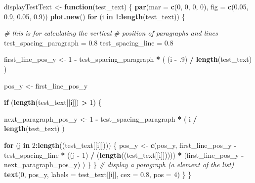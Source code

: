 \documentclass[12pt,]{book}
\newenvironment{Shaded}{\begin{snugshade}}{\end{snugshade}}
\newcommand{\CommentTok}[1]{\textcolor[rgb]{0.56,0.35,0.01}{\textit{#1}}}
\newcommand{\ControlFlowTok}[1]{\textcolor[rgb]{0.13,0.29,0.53}{\textbf{#1}}}
\newcommand{\DataTypeTok}[1]{\textcolor[rgb]{0.13,0.29,0.53}{#1}}
\newcommand{\DecValTok}[1]{\textcolor[rgb]{0.00,0.00,0.81}{#1}}
\newcommand{\FloatTok}[1]{\textcolor[rgb]{0.00,0.00,0.81}{#1}}
\newcommand{\KeywordTok}[1]{\textcolor[rgb]{0.13,0.29,0.53}{\textbf{#1}}}
\newcommand{\NormalTok}[1]{#1}
\newcommand{\OperatorTok}[1]{\textcolor[rgb]{0.81,0.36,0.00}{\textbf{#1}}}
\newcommand{\StringTok}[1]{\textcolor[rgb]{0.31,0.60,0.02}{#1}}
\begin{document}
\begin{Shaded}
\begin{Highlighting}[]
\NormalTok{displayTestText <-}\StringTok{ }\ControlFlowTok{function}\NormalTok{(test_text) \{}
  \KeywordTok{par}\NormalTok{(}\DataTypeTok{mar =} \KeywordTok{c}\NormalTok{(}\DecValTok{0}\NormalTok{, }\DecValTok{0}\NormalTok{, }\DecValTok{0}\NormalTok{, }\DecValTok{0}\NormalTok{), }\DataTypeTok{fig =} \KeywordTok{c}\NormalTok{(}\FloatTok{0.05}\NormalTok{, }\FloatTok{0.9}\NormalTok{, }\FloatTok{0.05}\NormalTok{, }\FloatTok{0.9}\NormalTok{))}
  \KeywordTok{plot.new}\NormalTok{()}
  \ControlFlowTok{for}\NormalTok{ (i }\ControlFlowTok{in} \DecValTok{1}\OperatorTok{:}\KeywordTok{length}\NormalTok{(test_text)) \{}
    
    \CommentTok{# this is for calculating the vertical }
    \CommentTok{# position of paragraphs and lines}
\NormalTok{    test_spacing_paragraph =}\StringTok{ }\FloatTok{0.8}
\NormalTok{    test_spacing_line =}\StringTok{ }\FloatTok{0.8}
    
\NormalTok{    first_line_pos_y <-}
\StringTok{      }\DecValTok{1} \OperatorTok{-}\StringTok{ }\NormalTok{test_spacing_paragraph }\OperatorTok{*}\StringTok{ }\NormalTok{( (i }\OperatorTok{-}\StringTok{ }\FloatTok{.9}\NormalTok{) }\OperatorTok{/}\StringTok{ }\KeywordTok{length}\NormalTok{(test_text) )}
    
\NormalTok{    pos_y <-}\StringTok{ }\NormalTok{first_line_pos_y}
    
    \ControlFlowTok{if}\NormalTok{ (}\KeywordTok{length}\NormalTok{(test_text[[i]]) }\OperatorTok{>}\StringTok{ }\DecValTok{1}\NormalTok{) \{}
      
\NormalTok{      next_paragraph_pos_y <-}
\StringTok{        }\DecValTok{1} \OperatorTok{-}\StringTok{ }\NormalTok{test_spacing_paragraph }\OperatorTok{*}\StringTok{ }\NormalTok{( i }\OperatorTok{/}\StringTok{ }\KeywordTok{length}\NormalTok{(test_text) )}
      
      \ControlFlowTok{for}\NormalTok{ (j }\ControlFlowTok{in} \DecValTok{2}\OperatorTok{:}\KeywordTok{length}\NormalTok{((test_text[[i]])))}
\NormalTok{      \{}
\NormalTok{        pos_y <-}
\StringTok{          }\KeywordTok{c}\NormalTok{(pos_y,}
\NormalTok{            first_line_pos_y }\OperatorTok{-}\StringTok{ }\NormalTok{test_spacing_line }\OperatorTok{*}\StringTok{ }
\StringTok{              }\NormalTok{((j }\OperatorTok{-}\StringTok{ }\DecValTok{1}\NormalTok{) }\OperatorTok{/}\StringTok{ }\NormalTok{(}\KeywordTok{length}\NormalTok{((test_text[[i]])))) }\OperatorTok{*}\StringTok{ }
\StringTok{              }\NormalTok{(first_line_pos_y }\OperatorTok{-}\StringTok{ }\NormalTok{next_paragraph_pos_y)}
\NormalTok{          )}
\NormalTok{      \}}
\NormalTok{    \}}
    \CommentTok{# display a paragraph (a element of the list)}
    \KeywordTok{text}\NormalTok{(}\DecValTok{0}\NormalTok{, pos_y, }\DataTypeTok{labels =}\NormalTok{ test_text[[i]], }\DataTypeTok{cex =} \FloatTok{0.8}\NormalTok{, }\DataTypeTok{pos =} \DecValTok{4}\NormalTok{)}
\NormalTok{  \}}
\NormalTok{\}}


\end{Highlighting}
\end{Shaded}
\end{document}
